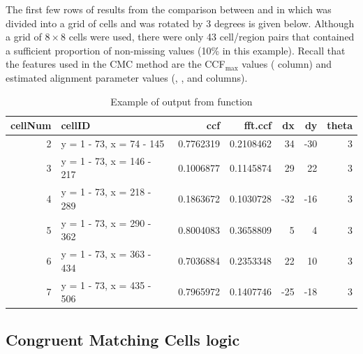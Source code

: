 The first few rows of results from the comparison between
 and  in which  was divided
into a grid of cells and  was rotated by 3 degrees is
given below. Although a grid of \(8 \times 8\) cells were used, there
were only 43 cell/region pairs that contained a sufficient proportion of
non-missing values (10\% in this example). Recall that the features used
in the CMC method are the CCF\(_{\max}\) values ( column) and
estimated alignment parameter values (, , and
 columns).

\begin{Schunk}
\end{Schunk}

\begin{Schunk}
\begin{table}[!h]

\caption{\label{tab:unnamed-chunk-10}\label{tab:cellCCF} Example of output from  function}
\centering
\begin{tabular}[t]{r|l|r|r|r|r|r}
\hline
cellNum & cellID & ccf & fft.ccf & dx & dy & theta\\
\hline
2 & y = 1 - 73, x = 74 - 145 & 0.7762319 & 0.2108462 & 34 & -30 & 3\\
\hline
3 & y = 1 - 73, x = 146 - 217 & 0.1006877 & 0.1145874 & 29 & 22 & 3\\
\hline
4 & y = 1 - 73, x = 218 - 289 & 0.1863672 & 0.1030728 & -32 & -16 & 3\\
\hline
5 & y = 1 - 73, x = 290 - 362 & 0.8004083 & 0.3658809 & 5 & 4 & 3\\
\hline
6 & y = 1 - 73, x = 363 - 434 & 0.7036884 & 0.2353348 & 22 & 10 & 3\\
\hline
7 & y = 1 - 73, x = 435 - 506 & 0.7965972 & 0.1407746 & -25 & -18 & 3\\
\hline
\end{tabular}
\end{table}

\end{Schunk}

\hypertarget{congruent-matching-cells-logic}{%
\subsection{Congruent Matching Cells
logic}\label{congruent-matching-cells-logic}}

